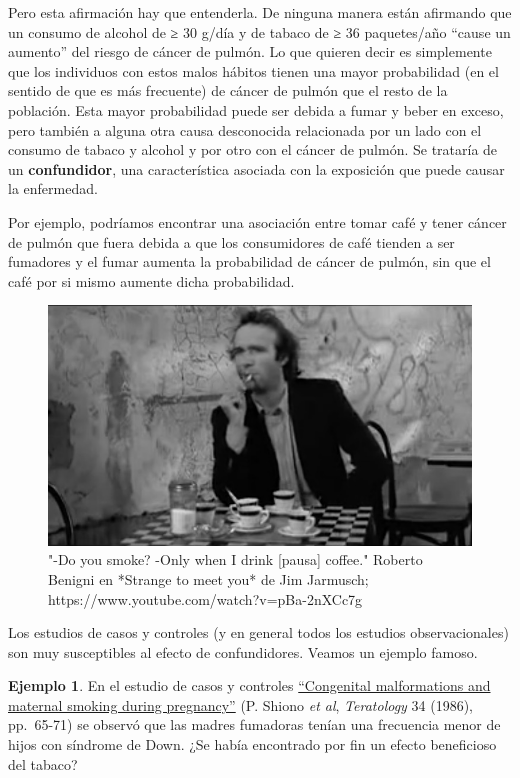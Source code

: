 \documentclass[
]{book}
\theoremstyle{definition}
\theoremstyle{definition}
\newtheorem{example}{Ejemplo}[chapter]
\theoremstyle{definition}
\theoremstyle{definition}
\theoremstyle{remark}
\begin{document}
Pero esta afirmación hay que entenderla. De ninguna manera están afirmando que un consumo de alcohol de ≥ 30 g/día y de tabaco de ≥ 36 paquetes/año ``cause un aumento'' del riesgo de cáncer de pulmón. Lo que quieren decir es simplemente que los individuos con estos malos hábitos tienen una mayor probabilidad (en el sentido de que es más frecuente) de cáncer de pulmón que el resto de la población. Esta mayor probabilidad puede ser debida a fumar y beber en exceso, pero también a alguna otra causa desconocida relacionada por un lado con el consumo de tabaco y alcohol y por otro con el cáncer de pulmón. Se trataría de un \textbf{confundidor}, una característica asociada con la exposición que puede causar la enfermedad.

Por ejemplo, podríamos encontrar una asociación entre tomar café y tener cáncer de pulmón que fuera debida a que los consumidores de café tienden a ser fumadores y el fumar aumenta la probabilidad de cáncer de pulmón, sin que el café por si mismo aumente dicha probabilidad.

\begin{figure}

{\centering \includegraphics[width=0.8\linewidth]{INREMDN_files/figure-html/benigni} 

}

\caption{"-Do you smoke? -Only when I drink [pausa] coffee." Roberto Benigni en  *Strange to meet you* de Jim Jarmusch; https://www.youtube.com/watch?v=pBa-2nXCc7g }\label{fig:benigni}
\end{figure}

Los estudios de casos y controles (y en general todos los estudios observacionales) son muy susceptibles al efecto de confundidores. Veamos un ejemplo famoso.

\begin{example}
\protect\hypertarget{exm:fumarDownCC}{}\label{exm:fumarDownCC}En el estudio de casos y controles \href{https://onlinelibrary.wiley.com/doi/abs/10.1002/tera.1420340109}{``Congenital malformations and maternal smoking during pregnancy''} (P. Shiono \emph{et al}, \emph{Teratology} 34 (1986), pp.~65-71) se observó que las madres fumadoras tenían una frecuencia menor de hijos con síndrome de Down. ¿Se había encontrado por fin un efecto beneficioso del tabaco?
\end{example}
\end{document}
